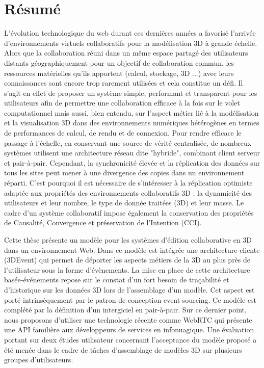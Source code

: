 \clearpage
\section*{Résumé}
\adjustmtc
{}

L’évolution technologique du web durant ces dernières années a favorisé l’arrivée d’environnements virtuels collaboratifs pour la modélisation 3D à grande échelle. Alors que la collaboration réuni dans un même espace partagé des utilisateurs distants géographiquement pour un objectif de collaboration commun, les ressources matérielles qu'ils apportent (calcul, stockage, 3D ...) avec leurs connaissances sont encore trop rarement utilisées et cela constitue un défi. Il s'agit en effet de proposer un système simple, performant et transparent pour les utilisateurs afin de permettre une collaboration efficace à la fois sur le volet computationnel mais aussi, bien entendu, sur l'aspect métier lié à la modélisation et la visualisation 3D dans des environnements numériques hétérogènes en termes de performances de calcul, de rendu et de connexion.
Pour rendre efficace le passage à l’échelle, en conservant une source de vérité centralisée, de nombreux systèmes utilisent une architecture réseau dite "hybride", combinant client serveur et pair-à-pair. Cependant, la synchronicité élevée et la réplication des données sur tous les sites peut mener à une divergence des copies dans un environnement réparti. C’est pourquoi il est nécessaire de s’intéresser à la réplication optimiste adaptée aux propriétés des environnements collaboratifs 3D : la dynamicité des utilisateurs et leur nombre, le type de donnée traitées (3D) et leur masse. Le cadre d’un système collaboratif impose également la conservation des propriétés de Causalité, Convergence et préservation de l’Intention (CCI).

Cette thèse présente un modèle pour les systèmes d’édition collaborative en 3D dans un environnement Web. Dans ce modèle est intégrée une architecture cliente (3DEvent) qui permet de déporter les aspects métiers de la 3D au plus près de l’utilisateur sous la forme d’évènements. La mise en place de cette architecture basée-événements repose sur le constat d’un fort besoin de traçabilité et d’historique sur les données 3D lors de l’assemblage d’un modèle. Cet aspect est porté intrinsèquement par le patron de conception event-sourcing. Ce modèle est complété par la définition d’un intergiciel en pair-à-pair. Sur ce dernier point, nous proposons d'utiliser une technologie récente comme WebRTC qui présente une API familière aux développeurs de services en infonuagique. Une évaluation portant sur deux études utilisateur concernant l’acceptance du modèle proposé a été menée dans le cadre de tâches d’assemblage de modèles 3D sur plusieurs groupes d’utilisateurs.

